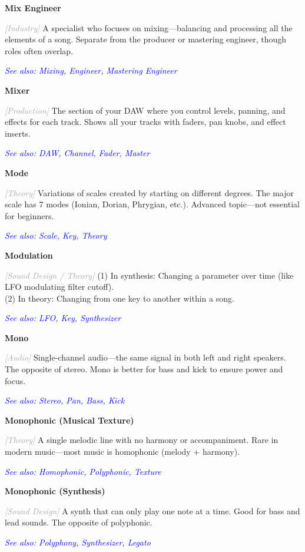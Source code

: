 \documentclass[11pt,letterpaper]{article}
\newcommand{\term}[1]{\textbf{\large\color{purple}#1}}
\newcommand{\category}[1]{\textcolor{darkgray}{\textit{\small [#1]}}}
\newcommand{\seealso}[1]{\textcolor{blue}{\textit{See also: #1}}}
\newenvironment{termdef}[1]
  {\noindent\term{#1}\par\nopagebreak}
  {\par\vspace{0.3em}}
\begin{document}
\begin{termdef}{Mix Engineer}
\category{Industry}
A specialist who focuses on mixing—balancing and processing all the elements of a song. Separate from the producer or mastering engineer, though roles often overlap.

\seealso{Mixing, Engineer, Mastering Engineer}
\end{termdef}

\begin{termdef}{Mixer}
\category{Production}
The section of your DAW where you control levels, panning, and effects for each track. Shows all your tracks with faders, pan knobs, and effect inserts.

\seealso{DAW, Channel, Fader, Master}
\end{termdef}

\begin{termdef}{Mode}
\category{Theory}
Variations of scales created by starting on different degrees. The major scale has 7 modes (Ionian, Dorian, Phrygian, etc.). Advanced topic—not essential for beginners.

\seealso{Scale, Key, Theory}
\end{termdef}

\begin{termdef}{Modulation}
\category{Sound Design / Theory}
(1) In synthesis: Changing a parameter over time (like LFO modulating filter cutoff). \\
(2) In theory: Changing from one key to another within a song.

\seealso{LFO, Key, Synthesizer}
\end{termdef}

\begin{termdef}{Mono}
\category{Audio}
Single-channel audio—the same signal in both left and right speakers. The opposite of stereo. Mono is better for bass and kick to ensure power and focus.

\seealso{Stereo, Pan, Bass, Kick}
\end{termdef}

\begin{termdef}{Monophonic (Musical Texture)}
\category{Theory}
A single melodic line with no harmony or accompaniment. Rare in modern music—most music is homophonic (melody + harmony).

\seealso{Homophonic, Polyphonic, Texture}
\end{termdef}

\begin{termdef}{Monophonic (Synthesis)}
\category{Sound Design}
A synth that can only play one note at a time. Good for bass and lead sounds. The opposite of polyphonic.

\seealso{Polyphony, Synthesizer, Legato}
\end{termdef}
\end{document}
